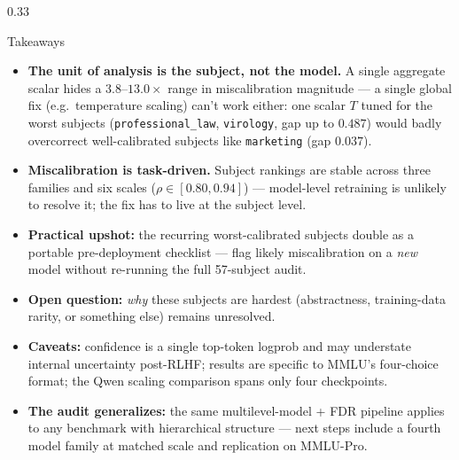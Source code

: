 \documentclass[final]{beamer}
\begin{document}
\begin{frame}[t]
\begin{columns}[t]
\begin{column}{0.33\linewidth}
    \begin{block}{Takeaways}
      \begin{itemize}
        \item \textbf{The unit of analysis is the subject, not the model.}
          A single aggregate scalar hides a $3.8$--$13.0\times$ range in
          miscalibration magnitude --- a single global fix (e.g.\
          temperature scaling) can't work either: one scalar $T$ tuned for
          the worst subjects (\texttt{professional\_law}, \texttt{virology},
          gap up to $0.487$) would badly overcorrect well-calibrated
          subjects like \texttt{marketing} (gap $0.037$).
        \vspace{0.3em}
        \item \textbf{Miscalibration is task-driven.} Subject rankings are
          stable across three families and six scales
          ($\rho \in [0.80,0.94]$) --- model-level retraining is unlikely to
          resolve it; the fix has to live at the subject level.
        \vspace{0.3em}
        \item \textbf{Practical upshot:} the recurring worst-calibrated
          subjects double as a portable pre-deployment checklist --- flag
          likely miscalibration on a \emph{new} model without re-running the
          full 57-subject audit.
        \vspace{0.3em}
        \item \textbf{Open question:} \emph{why} these subjects are hardest
          (abstractness, training-data rarity, or something else) remains
          unresolved.
        \vspace{0.3em}
        \item \textbf{Caveats:} confidence is a single top-token logprob and
          may understate internal uncertainty post-RLHF; results are specific
          to MMLU's four-choice format; the Qwen scaling comparison spans
          only four checkpoints.
        \vspace{0.3em}
        \item \textbf{The audit generalizes:} the same multilevel-model +
          FDR pipeline applies to any benchmark with hierarchical structure
          --- next steps include a fourth model family at matched scale and
          replication on MMLU-Pro.
      \end{itemize}
    \end{block}


\end{column}
\end{columns}
\end{frame}
\end{document}
